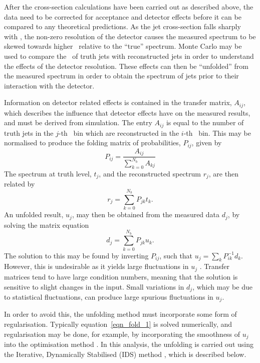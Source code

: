After the cross-section calculations have been carried out as described above, the data need to be corrected for acceptance and detector effects before it can be compared to any theoretical predictions. As the jet cross-section falls sharply with \pt, the non-zero resolution of the detector causes the measured spectrum to be skewed towards higher \pt~relative to the ``true'' spectrum. Monte Carlo may be used to compare the \pt~of truth jets with reconstructed jets in order to understand the effects of the detector resolution. These effects can then be ``unfolded'' from the measured spectrum in order to obtain the spectrum of jets prior to their interaction with the detector.



Information on detector related effects is contained in the transfer matrix, $A_{ij}$, which describes the influence that detector effects have on the measured results, and must be derived from simulation. The entry $A_{ij}$ is equal to the number of truth jets in the $j$-th \pt~bin which are reconstructed in the $i$-th \pt~bin.  This may be normalised to produce the folding matrix of probabilities, $P_{ij}$, given by
\begin{equation}
P_{ij} = \frac{A_{ij}}{\sum_{k=0}^{N_b} A_{kj}}
\end{equation}
The spectrum at truth level, $t_j$, and the reconstructed spectrum $r_j$, are then related by
\begin{equation}
r_j = \sum_{k=0}^{N_b} P_{jk} t_k.
\end{equation}
An unfolded result, $u_j$, may then be obtained from the measured data $d_j$, by solving the matrix equation
\begin{equation}
d_j = \sum_{k=0}^{N_b} P_{jk} u_k.
\label{eqn_fold_1}
\end{equation}
The solution to this may be found by inverting $P_{ij}$, such that $u_j = \sum_k P^{-1}_{ik} d_k$. However, this is undesirable as it yields large fluctuations in $u_j$ \cite{Blobel:2002pu}. Transfer matrices tend to have large condition numbers, meaning that the solution is sensitive to slight changes in the input. Small variations in $d_j$, which may be due to statistical fluctuations, can produce large spurious fluctuations in $u_j$. 

In order to avoid this, the unfolding method must incorporate some form of regularisation. Typically equation~\ref{eqn_fold_1} is solved numerically, and regularisation may be done, for example, by incorporating the smoothness of $u_j$ into the optimisation method \cite{Blobel:2002pu}. In this analysis, the unfolding is carried out using the Iterative, Dynamically Stabilised (IDS) method \cite{Malaescu:2009dm,Malaescu:2011yg}, which is described below. 

